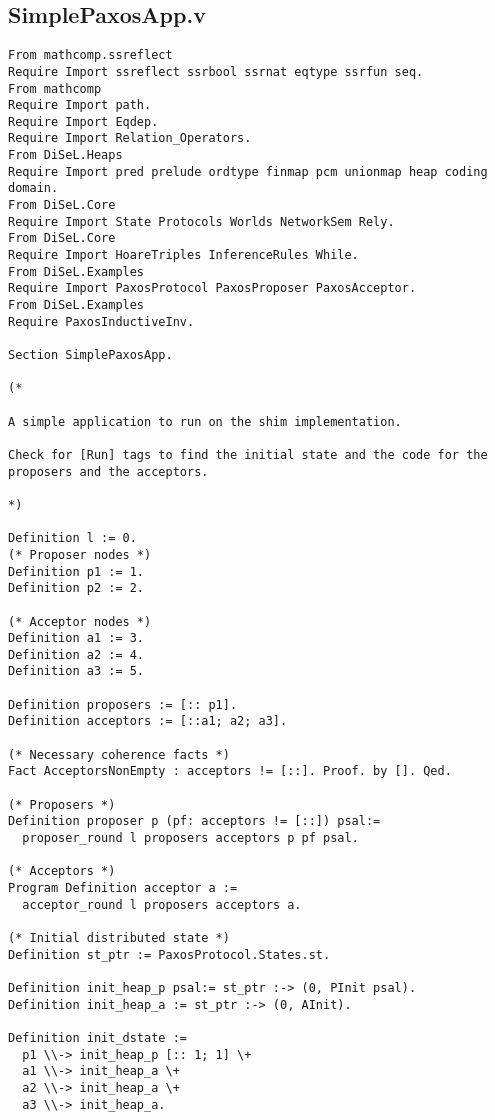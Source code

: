 \begin{landscape}
\section{SimplePaxosApp.v}
\begin{multicols*}{2}
\begin{lstlisting}[style=SourceCodeListing]
From mathcomp.ssreflect
Require Import ssreflect ssrbool ssrnat eqtype ssrfun seq.
From mathcomp
Require Import path.
Require Import Eqdep.
Require Import Relation_Operators.
From DiSeL.Heaps
Require Import pred prelude ordtype finmap pcm unionmap heap coding domain.
From DiSeL.Core
Require Import State Protocols Worlds NetworkSem Rely.
From DiSeL.Core
Require Import HoareTriples InferenceRules While.
From DiSeL.Examples
Require Import PaxosProtocol PaxosProposer PaxosAcceptor.
From DiSeL.Examples
Require PaxosInductiveInv.

Section SimplePaxosApp.

(*

A simple application to run on the shim implementation.

Check for [Run] tags to find the initial state and the code for the
proposers and the acceptors.

*)

Definition l := 0.
(* Proposer nodes *)
Definition p1 := 1.
Definition p2 := 2.

(* Acceptor nodes *)
Definition a1 := 3.
Definition a2 := 4.
Definition a3 := 5.

Definition proposers := [:: p1].
Definition acceptors := [::a1; a2; a3].

(* Necessary coherence facts *)
Fact AcceptorsNonEmpty : acceptors != [::]. Proof. by []. Qed.

(* Proposers *)
Definition proposer p (pf: acceptors != [::]) psal:=
  proposer_round l proposers acceptors p pf psal.

(* Acceptors *)
Program Definition acceptor a :=
  acceptor_round l proposers acceptors a.

(* Initial distributed state *)
Definition st_ptr := PaxosProtocol.States.st.

Definition init_heap_p psal:= st_ptr :-> (0, PInit psal).
Definition init_heap_a := st_ptr :-> (0, AInit).

Definition init_dstate :=
  p1 \\-> init_heap_p [:: 1; 1] \+
  a1 \\-> init_heap_a \+
  a2 \\-> init_heap_a \+
  a3 \\-> init_heap_a.


\end{lstlisting}
\end{multicols*}
\end{landscape}
